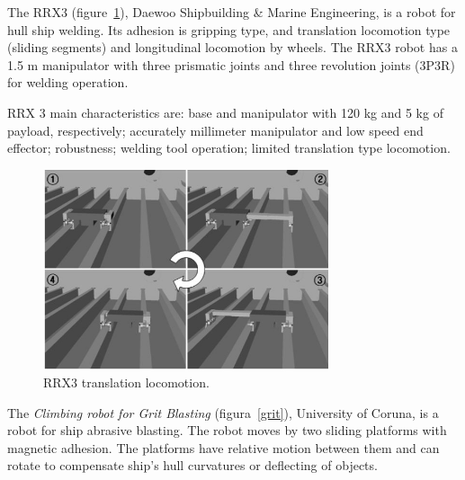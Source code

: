 The RRX3 (figure~\ref{rrx3}), Daewoo Shipbuilding \& Marine Engineering, is a
robot for hull ship welding. Its adhesion is gripping type, and translation
locomotion type  (sliding segments) and longitudinal locomotion by wheels.
The RRX3 robot has a 1.5 m manipulator with three prismatic joints and three
revolution joints  (3P3R) for welding operation.

RRX 3 main characteristics are: base and manipulator with
120 kg and 5 kg of payload, respectively; accurately
millimeter manipulator and low speed end effector; robustness; welding tool
operation; limited translation type locomotion.

\begin{figure}[ht]
\centering
\includegraphics[width=8.4cm]{figs/climbers/RRX3_moving.jpg}
\caption{RRX3 translation locomotion.}
\label{rrx3}
\end{figure}

The \emph{Climbing robot for Grit Blasting} (figura~\ref{grit}), University of
Coruna, is a robot for ship abrasive blasting. The robot moves by two
sliding platforms with magnetic adhesion. The platforms have relative motion
between them and can rotate to compensate ship's hull curvatures or
deflecting of objects.

